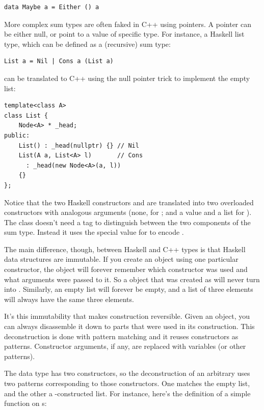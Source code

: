 \begin{Verbatim}
data Maybe a = Either () a
\end{Verbatim}
More complex sum types are often faked in C++ using pointers. A pointer
can be either null, or point to a value of specific type. For instance,
a Haskell list type, which can be defined as a (recursive) sum type:

\begin{Verbatim}
List a = Nil | Cons a (List a)
\end{Verbatim}
can be translated to C++ using the null pointer trick to implement the
empty list:

\begin{Verbatim}
template<class A>
class List { 
    Node<A> * _head;
public:
    List() : _head(nullptr) {} // Nil
    List(A a, List<A> l)       // Cons
      : _head(new Node<A>(a, l))
    {}
};
\end{Verbatim}
Notice that the two Haskell constructors  and 
are translated into two overloaded  constructors with
analogous arguments (none, for ; and a value and a list for
). The  class doesn't need a tag to
distinguish between the two components of the sum type. Instead it uses
the special  value for  to encode
.

The main difference, though, between Haskell and C++ types is that
Haskell data structures are immutable. If you create an object using one
particular constructor, the object will forever remember which
constructor was used and what arguments were passed to it. So a
 object that was created as  will
never turn into . Similarly, an empty list will forever
be empty, and a list of three elements will always have the same three
elements.

It's this immutability that makes construction reversible. Given an
object, you can always disassemble it down to parts that were used in
its construction. This deconstruction is done with pattern matching and
it reuses constructors as patterns. Constructor arguments, if any, are
replaced with variables (or other patterns).

The  data type has two constructors, so the deconstruction
of an arbitrary  uses two patterns corresponding to those
constructors. One matches the empty  list, and the other a
-constructed list. For instance, here's the definition of a
simple function on s:

